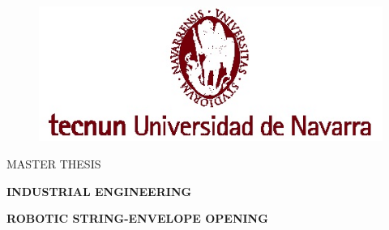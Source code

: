 \begin{titlepage}
\begin{center}
	\vspace*{-1.35in}
	\begin{figure}[htb]
		\begin{center}
			\includegraphics{tecnun.png}
		\end{center}
	\end{figure}

	\vspace*{0.8in}
	\large{MASTER THESIS}

	\large{\textbf{INDUSTRIAL ENGINEERING}}
       
  	\vspace{2in}
    \Huge{\textbf{ROBOTIC STRING-ENVELOPE OPENING}}
	~ \vfill
\end{center}

	\\
	
 
\end{titlepage}


